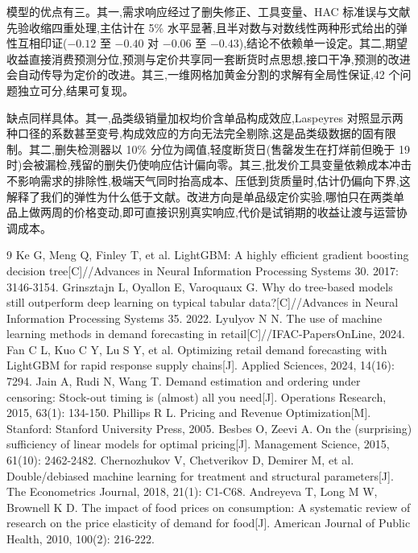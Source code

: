 模型的优点有三。其一,需求响应经过了删失修正、工具变量、HAC 标准误与文献先验收缩四重处理,主估计在 5\% 水平显著,且半对数与对数线性两种形式给出的弹性互相印证($-0.12$ 至 $-0.40$ 对 $-0.06$ 至 $-0.43$),结论不依赖单一设定。其二,期望收益直接消费预测分位,预测与定价共享同一套断货时点思想,接口干净,预测的改进会自动传导为定价的改进。其三,一维网格加黄金分割的求解有全局性保证,42 个问题独立可分,结果可复现。

缺点同样具体。其一,品类级销量加权均价含单品构成效应,Laspeyres 对照显示两种口径的系数甚至变号,构成效应的方向无法完全剔除,这是品类级数据的固有限制。其二,删失检测器以 10\% 分位为阈值,轻度断货日(售罄发生在打烊前但晚于 19 时)会被漏检,残留的删失仍使响应估计偏向零。其三,批发价工具变量依赖成本冲击不影响需求的排除性,极端天气同时抬高成本、压低到货质量时,估计仍偏向下界,这解释了我们的弹性为什么低于文献。改进方向是单品级定价实验,哪怕只在两类单品上做两周的价格变动,即可直接识别真实响应,代价是试销期的收益让渡与运营协调成本。

\begin{thebibliography}{9}
 Ke G, Meng Q, Finley T, et al. LightGBM: A highly efficient gradient boosting decision tree[C]//Advances in Neural Information Processing Systems 30. 2017: 3146-3154.
 Grinsztajn L, Oyallon E, Varoquaux G. Why do tree-based models still outperform deep learning on typical tabular data?[C]//Advances in Neural Information Processing Systems 35. 2022.
 Lyulyov N N. The use of machine learning methods in demand forecasting in retail[C]//IFAC-PapersOnLine, 2024.
 Fan C L, Kuo C Y, Lu S Y, et al. Optimizing retail demand forecasting with LightGBM for rapid response supply chains[J]. Applied Sciences, 2024, 14(16): 7294.
 Jain A, Rudi N, Wang T. Demand estimation and ordering under censoring: Stock-out timing is (almost) all you need[J]. Operations Research, 2015, 63(1): 134-150.
 Phillips R L. Pricing and Revenue Optimization[M]. Stanford: Stanford University Press, 2005.
 Besbes O, Zeevi A. On the (surprising) sufficiency of linear models for optimal pricing[J]. Management Science, 2015, 61(10): 2462-2482.
 Chernozhukov V, Chetverikov D, Demirer M, et al. Double/debiased machine learning for treatment and structural parameters[J]. The Econometrics Journal, 2018, 21(1): C1-C68.
 Andreyeva T, Long M W, Brownell K D. The impact of food prices on consumption: A systematic review of research on the price elasticity of demand for food[J]. American Journal of Public Health, 2010, 100(2): 216-222.
\end{thebibliography}

